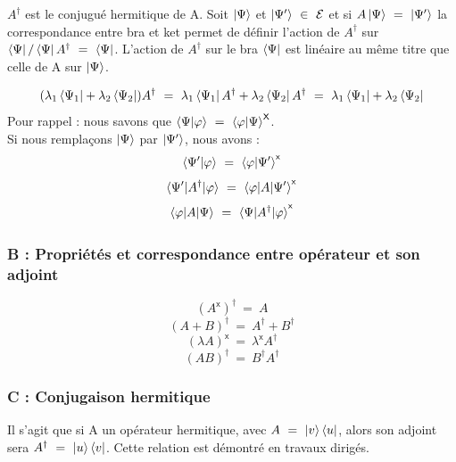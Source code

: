 \documentclass[12pt,a4paper,titlepage]{book}
\begin{document}
$A^{\dagger}$ est le conjugué hermitique de A. Soit $\ket{\Psi}$ et $\ket{\Psi'} ~\in~ \mathcal{E}$ et si $A \ket{\Psi} ~=~ \ket{\Psi'}$ la correspondance entre bra et ket permet de définir l'action de $A^\dagger$ sur $\bra{\Psi} / \bra{\Psi} A^\dagger ~=~ \bra{\Psi}$. L'action de $A^\dagger$ sur le bra $\bra{\Psi}$ est linéaire au même titre que celle de A sur $\ket{\Psi}$.

\begin{equation*}
(\lambda_1 \bra{\Psi_1} + \lambda_2 \bra{\Psi_2}) A^\dagger ~=~ \lambda_1 \bra{\Psi_1} A^\dagger + \lambda_2 \bra{\Psi_2} A^\dagger ~=~ \lambda_1 \bra{\Psi_1} + \lambda_2 \bra{\Psi_2}
\end{equation*}
Pour rappel : nous savons que $\braket{\Psi | \varphi} ~=~ \braket{\varphi | \Psi}^{\mathsf{X}}$.\\

Si nous remplaçons $\ket{\Psi}$ par $\ket{\Psi'}$, nous avons :\\
\begin{equation*}
\braket{\Psi' | \varphi} ~=~ \braket{\varphi | \Psi'}^{\mathsf{x}}
\end{equation*}
\begin{equation*}
\braket{\Psi' |A^{\dagger}| \varphi} ~=~ \braket{\varphi |A| \Psi'}^{\mathsf{x}}
\end{equation*}
\begin{equation*}
\braket{\varphi |A| \Psi} ~=~ \braket{\Psi |A^{\dagger}| \varphi}^{\mathsf{x}}
\end{equation*}

\subsubsection{B : Propriétés et correspondance entre opérateur et son adjoint}

\begin{equation*}
(A^{\mathsf{x}})^\dagger ~=~ A
\end{equation*}
\begin{equation*}
(A+B)^\dagger ~=~ A^\dagger + B^\dagger
\end{equation*}
\begin{equation*}
(\lambda A)^\mathsf{x} ~=~ \lambda^\mathsf{x} A^\dagger
\end{equation*}
\begin{equation*}
(AB)^\dagger ~=~ B^\dagger A^\dagger
\end{equation*}

\subsubsection{C : Conjugaison hermitique}
Il s'agit que si A un opérateur hermitique, avec $A ~=~ \ket v \bra u$, alors son adjoint sera $A^\dagger ~=~ \ket u \bra v$. Cette relation est démontré en travaux dirigés.
\end{document}
